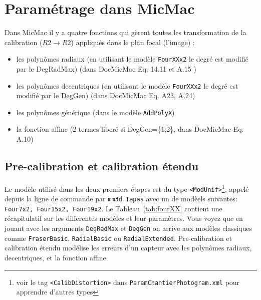 \documentclass[11pt,a4paper,oneside]{book}
\begin{document}

\section{Paramétrage dans MicMac}
%
Dans MicMac il y a quatre fonctions qui gèrent toutes les transformation de la calibration ($R2 \rightarrow R2$) appliqués dans le plan focal (l'image) :
\begin{itemize}
\item les polynômes radiaux (en utilisant le modèle {\tt FourXXx2} le degré est modifié par le DegRadMax) (dans DocMicMac Eq. 14.11 et A.15 )
\item les polynômes decentriques (en utilisant le modèle {\tt FourXXx2} le degré est modifié par le DegGen) (dans DocMicMac Eq. A23, A.24) 
\item les polynômes générique (dans le modèle {\tt AddPolyX})
\item la fonction affine (2 termes liberé si DegGen=\{1,2\}, dans DocMicMac Eq. A.10)
\end{itemize}
%
\subsection{Pre-calibration et calibration étendu}
%
Le modèle utilisé dans les deux premiers étapes est du type {\tt <ModUnif>}\footnote{voir le tag {\tt <CalibDistortion>} dans {\tt ParamChantierPhotogram.xml} pour apprendre d'autres types}, appelé depuis la ligne de commande par {\tt mm3d Tapas} avec un de modèels suivantes: {\tt Four7x2, Four15x2, Four19x2}. Le Tableau~\ref{tab:fourXX} contient une récapitulatif sur les differentes modèles et leur paramètres. Vous voyez que en jouant avec les arguments {\tt DegRadMax} et {\tt DegGen} on arrive aux modèles classiques comme {\tt FraserBasic}, {\tt RadialBasic} ou {\tt  RadialExtended}. Pre-calibration et calibration étendu modélise les erreurs d'un capteur avec les polynômes radiaux, decentriques, et la fonction affine.
%
\end{document}
